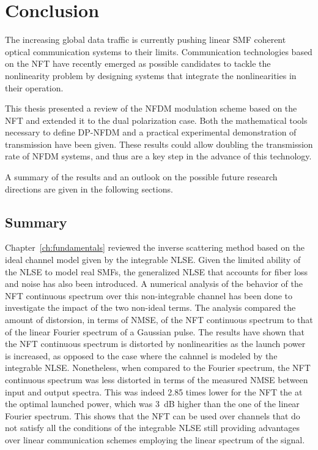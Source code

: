 \chapter{Conclusion}\label{ch:conclusion}

The increasing global data traffic is currently pushing linear \ac{SMF} coherent optical communication systems to their limits. Communication technologies based on the \ac{NFT} have recently emerged as possible candidates to tackle the nonlinearity problem by designing systems that integrate the nonlinearities in their operation.

This thesis presented a review of the \ac{NFDM} modulation scheme based on the \ac{NFT} and extended it to the dual polarization case. Both the  mathematical tools necessary to define \ac{DP-NFDM} and a practical experimental demonstration of transmission have been given.
These results could allow doubling the transmission rate of \ac{NFDM} systems, and thus are a key step in the advance of this technology.

A summary of the results and an outlook on the possible future research directions are given in the following sections.

\section{Summary}

Chapter~\ref{ch:fundamentals} reviewed the inverse scattering method based on
the ideal channel model given by the integrable \ac{NLSE}. Given the limited
ability of the \ac{NLSE} to model real \acp{SMF}, the generalized \ac{NLSE} that
accounts for fiber loss and noise has also been introduced. A numerical analysis
of the behavior of the \ac{NFT} continuous spectrum over this non-integrable channel
has been done to investigate the impact of the two non-ideal terms. The analysis
compared the amount of distorsion, in terms of \ac{NMSE}, of the \ac{NFT} continuous spectrum to that of the
linear Fourier spectrum of a Gaussian pulse. The results
have shown that the \ac{NFT} continuous spectrum is distorted by nonlinearities as
the launch power is increased, as opposed to the case where the cahnnel is modeled by the integrable \ac{NLSE}.
Nonetheless, when compared to the Fourier spectrum, the \ac{NFT} continuous spectrum was less distorted in terms of the measured \ac{NMSE} between input and output spectra. This was indeed 2.85 times lower for the \ac{NFT} the at the optimal launched power, which was \SI{3}{\dB} higher than the one of the linear Fourier spectrum. This shows that the \ac{NFT} can be used over channels that do not satisfy
all the conditions of the integrable \ac{NLSE} still providing advantages over
linear communication schemes employing the linear spectrum of the signal.

